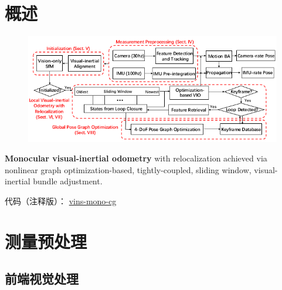 \documentclass[12pt,a4paper]{article}
\begin{document}
\maketitle
\tableofcontents

\noindent
\setlength{\parindent}{2em}
\setlength{\parskip}{0.3em}
\linespread{1}

\section{概述} 

\begin{figure}[htbp]
\centering
\includegraphics[scale=0.6]{images/vins_mono_framework.png}
\end{figure}

\textbf{Monocular visual-inertial odometry} with relocalization achieved via nonlinear graph optimization-based, tightly-coupled, sliding window, visual-inertial bundle adjustment. \cite{qin2017vins}

代码（注释版）： \href{https://github.com/cggos/vins_mono_cg}{vins-mono-cg} 

\section{测量预处理} 

\subsection{前端视觉处理}
\end{document}
